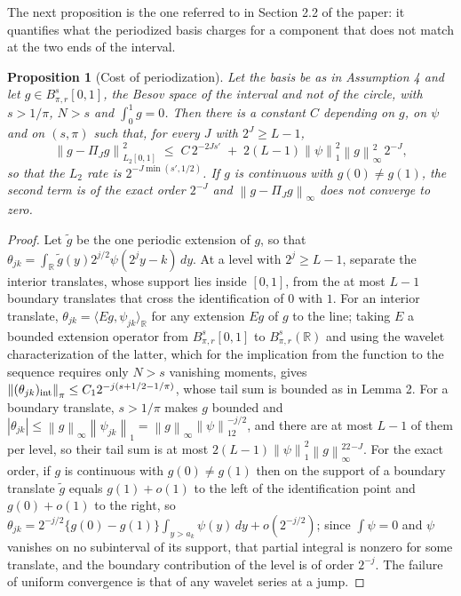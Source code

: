 \documentclass[10pt]{book}
\newtheorem{proposition}{Proposition}[section]
\theoremstyle{definition}
\newcommand{\R}{\mathbb{R}}
\newcommand{\norm}[1]{\left\lVert #1 \right\rVert}
\newcommand{\inner}[2]{\langle #1, #2 \rangle}
\newcommand{\lev}{j}
\newcommand{\tsl}{k}
\newcommand{\PiJ}{\Pi_{J}}
\newcommand{\Besov}[3]{B^{#1}_{#2,#3}}
\newcommand{\seff}{s'}
\begin{document}
The next proposition is the one referred to in Section 2.2 of the paper: it
quantifies what the periodized basis charges for a component that does not
match at the two ends of the interval.

\begin{proposition}[Cost of periodization]
\label{prop:periodization}
Let the basis be as in Assumption 4 and let
$g \in \Besov{s}{\pi}{r}[0,1]$, the Besov space of the interval and not of the
circle, with $s > 1/\pi$, $N > s$ and $\int_0^1 g = 0$. Then there is a
constant $C$ depending on $g$, on $\psi$ and on $(s,\pi)$ such that, for every
$J$ with $2^J \ge L-1$,
\[
  \norm{g-\PiJ g}^2_{L_2[0,1]} \;\le\; C\,2^{-2J\seff}
  \;+\; 2(L-1)\norm{\psi}_1^2\norm{g}^2_{\infty}\,2^{-J},
\]
so that the $L_2$ rate is $2^{-J\min(\seff,1/2)}$. If $g$ is continuous with
$g(0) \ne g(1)$, the second term is of the exact order $2^{-J}$ and
$\norm{g-\PiJ g}_{\infty}$ does not converge to zero.
\end{proposition}

\begin{proof}
Let $\tilde g$ be the one periodic extension of $g$, so that
$\theta_{\lev\tsl} = \int_{\R}\tilde g(y)2^{\lev/2}\psi(2^{\lev}y-\tsl)\,dy$.
At a level with $2^{\lev} \ge L-1$, separate the interior translates, whose
support lies inside $[0,1]$, from the at most $L-1$ boundary translates that
cross the identification of $0$ with $1$. For an interior translate,
$\theta_{\lev\tsl} = \inner{Eg}{\psi_{\lev\tsl}}_{\R}$ for any extension $Eg$
of $g$ to the line; taking $E$ a bounded extension operator from
$\Besov{s}{\pi}{r}[0,1]$ to $\Besov{s}{\pi}{r}(\R)$
\citep[Chapter 3]{Triebel-1983} and using the wavelet characterization of the
latter, which for the implication from the function to the sequence requires
only $N > s$ vanishing moments, gives
$\norm{(\theta_{\lev\tsl})_{\rm int}}_{\pi} \le C_12^{-\lev(s+1/2-1/\pi)}$,
whose tail sum is bounded as in Lemma 2. For a boundary translate,
$s > 1/\pi$ makes $g$ bounded and
$|\theta_{\lev\tsl}| \le \norm{g}_{\infty}\norm{\psi_{\lev\tsl}}_1 =
\norm{g}_{\infty}\norm{\psi}_12^{-\lev/2}$, and there are at most $L-1$ of
them per level, so their tail sum is at most
$2(L-1)\norm{\psi}_1^2\norm{g}_{\infty}^22^{-J}$. For the exact order, if $g$
is continuous with $g(0) \ne g(1)$ then on the support of a boundary translate
$\tilde g$ equals $g(1)+o(1)$ to the left of the identification point and
$g(0)+o(1)$ to the right, so
$\theta_{\lev\tsl} = 2^{-\lev/2}\{g(0)-g(1)\}\int_{y>a_{\tsl}}\psi(y)\,dy +
o(2^{-\lev/2})$; since $\int\psi = 0$ and $\psi$ vanishes on no subinterval of
its support, that partial integral is nonzero for some translate, and the
boundary contribution of the level is of order $2^{-\lev}$. The failure of
uniform convergence is that of any wavelet series at a jump.
\end{proof}
\end{document}
